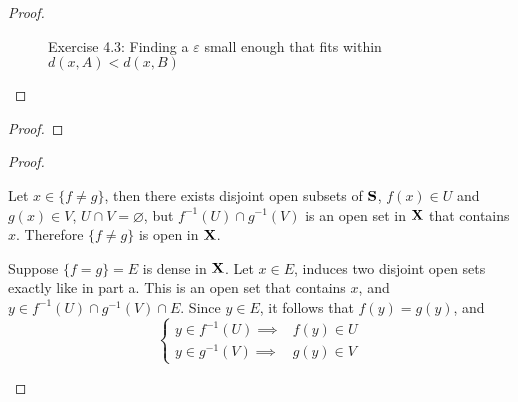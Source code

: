 \documentclass[../../main.tex]{subfiles}
\begin{document}
\begin{proof}
\begin{figure}
    \caption{Exercise 4.3: Finding a $\varepsilon$ small enough that fits within $d(x,A) < d(x,B)$}
    \label{fig:ex4.3}
\end{figure}
\end{proof}
\newpage

\begin{wts}
    
\end{wts}
\begin{proof}
    
\end{proof}

\begin{wts}
\end{wts}

\begin{proof}
    \begin{enumalpha}
        \item[]
        \item Let $x\in \{f\neq g\}$, then there exists disjoint open subsets of ${\mathbf{S}}$, $f(x)\in U$ and $g(x)\in V$, $U\cap V=\varnothing$, but $f^{-1}(U)\cap g^{-1}(V)$ is an open set in ${\mathbf{X}}$ that contains $x$. Therefore $\{f\neq g\}$ is open in ${\mathbf{X}}$.
        \item Suppose $\{f=g\}=E$ is dense in ${\mathbf{X}}$. Let $x\in E$, induces two disjoint open sets exactly like in part a. This is an open set that contains $x$, and $y\in f^{-1}(U)\cap g^{-1}(V)\cap E$. Since $y\in E$, it follows that $f(y) = g(y)$, and
        \[
            \begin{cases}
            y\in f^{-1}(U)\implies &f(y)\in U\\
            y\in g^{-1}(V)\implies &g(y)\in V
            \end{cases}
        \]
    \end{enumalpha}
\end{proof}
\newpage


\end{document}
